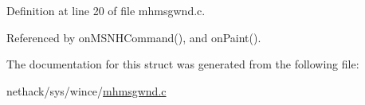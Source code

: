 Definition at line 20 of file mhmsgwnd.\+c.



Referenced by on\+M\+S\+N\+H\+Command(), and on\+Paint().



The documentation for this struct was generated from the following file\+:\begin{DoxyCompactItemize}
\item 
nethack/sys/wince/\hyperlink{sys_2wince_2mhmsgwnd_8c}{mhmsgwnd.\+c}\end{DoxyCompactItemize}
